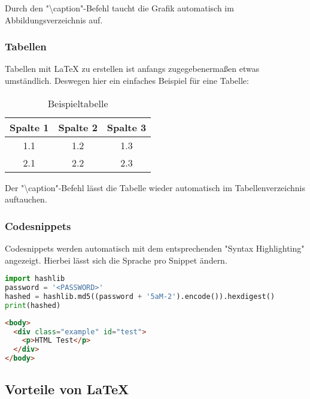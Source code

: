 Durch den "\textbackslash{}caption"-Befehl taucht die Grafik automatisch im Abbildungsverzeichnis auf.

\subsubsection{Tabellen}

Tabellen mit \LaTeX{} zu erstellen ist anfangs zugegebenermaßen etwas umständlich. Deswegen hier ein einfaches
Beispiel für eine Tabelle:


\begin{table}[H]
  \centering
  \begin{tabular}{|c|c|c|}
    \hline
    Spalte 1 & Spalte 2 & Spalte 3 \\
    \hline
    1.1 & 1.2 & 1.3 \\
    2.1 & 2.2 & 2.3 \\
    \hline
  \end{tabular}
  \caption{Beispieltabelle}
  \label{tab:Beispieltabelle}
\end{table}

Der "\textbackslash{}caption"-Befehl lässt die Tabelle wieder automatisch im Tabellenverzeichnis auftauchen.

\subsubsection{Codesnippets}

Codesnippets werden automatisch mit dem entsprechenden "Syntax Highlighting" angezeigt.
Hierbei lässt sich die Sprache pro Snippet ändern.
\vspace{.5cm}

\begin{lstlisting}[language=Python,caption=MD5-Hash-Generierung in Python]
import hashlib
password = '<PASSWORD>'
hashed = hashlib.md5((password + '5aM-2').encode()).hexdigest()
print(hashed)
\end{lstlisting}

\begin{lstlisting}[language=HTML,caption=HTML-Beispiel]
<body>
  <div class="example" id="test">
    <p>HTML Test</p>
  </div>
</body>
\end{lstlisting}

\subsection{Vorteile von \LaTeX}

